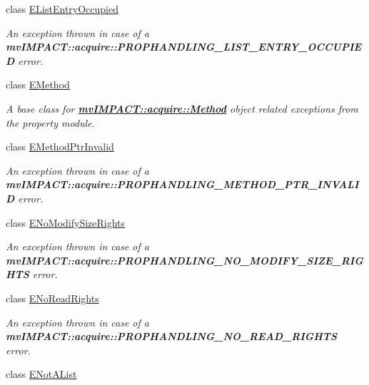 \begin{DoxyCompactItemize}
class \hyperlink{classmv_i_m_p_a_c_t_1_1acquire_1_1_e_list_entry_occupied}{E\+List\+Entry\+Occupied}
\begin{DoxyCompactList}\small\item\em An exception thrown in case of a {\bfseries mv\+I\+M\+P\+A\+C\+T\+::acquire\+::\+P\+R\+O\+P\+H\+A\+N\+D\+L\+I\+N\+G\+\_\+\+L\+I\+S\+T\+\_\+\+E\+N\+T\+R\+Y\+\_\+\+O\+C\+C\+U\+P\+I\+E\+D} error. \end{DoxyCompactList}\item 
class \hyperlink{classmv_i_m_p_a_c_t_1_1acquire_1_1_e_method}{E\+Method}
\begin{DoxyCompactList}\small\item\em A base class for {\bfseries \hyperlink{classmv_i_m_p_a_c_t_1_1acquire_1_1_method}{mv\+I\+M\+P\+A\+C\+T\+::acquire\+::\+Method}} object related exceptions from the property module. \end{DoxyCompactList}\item 
class \hyperlink{classmv_i_m_p_a_c_t_1_1acquire_1_1_e_method_ptr_invalid}{E\+Method\+Ptr\+Invalid}
\begin{DoxyCompactList}\small\item\em An exception thrown in case of a {\bfseries mv\+I\+M\+P\+A\+C\+T\+::acquire\+::\+P\+R\+O\+P\+H\+A\+N\+D\+L\+I\+N\+G\+\_\+\+M\+E\+T\+H\+O\+D\+\_\+\+P\+T\+R\+\_\+\+I\+N\+V\+A\+L\+I\+D} error. \end{DoxyCompactList}\item 
class \hyperlink{classmv_i_m_p_a_c_t_1_1acquire_1_1_e_no_modify_size_rights}{E\+No\+Modify\+Size\+Rights}
\begin{DoxyCompactList}\small\item\em An exception thrown in case of a {\bfseries mv\+I\+M\+P\+A\+C\+T\+::acquire\+::\+P\+R\+O\+P\+H\+A\+N\+D\+L\+I\+N\+G\+\_\+\+N\+O\+\_\+\+M\+O\+D\+I\+F\+Y\+\_\+\+S\+I\+Z\+E\+\_\+\+R\+I\+G\+H\+T\+S} error. \end{DoxyCompactList}\item 
class \hyperlink{classmv_i_m_p_a_c_t_1_1acquire_1_1_e_no_read_rights}{E\+No\+Read\+Rights}
\begin{DoxyCompactList}\small\item\em An exception thrown in case of a {\bfseries mv\+I\+M\+P\+A\+C\+T\+::acquire\+::\+P\+R\+O\+P\+H\+A\+N\+D\+L\+I\+N\+G\+\_\+\+N\+O\+\_\+\+R\+E\+A\+D\+\_\+\+R\+I\+G\+H\+T\+S} error. \end{DoxyCompactList}\item 
class \hyperlink{classmv_i_m_p_a_c_t_1_1acquire_1_1_e_not_a_list}{E\+Not\+A\+List}

\end{DoxyCompactItemize}
